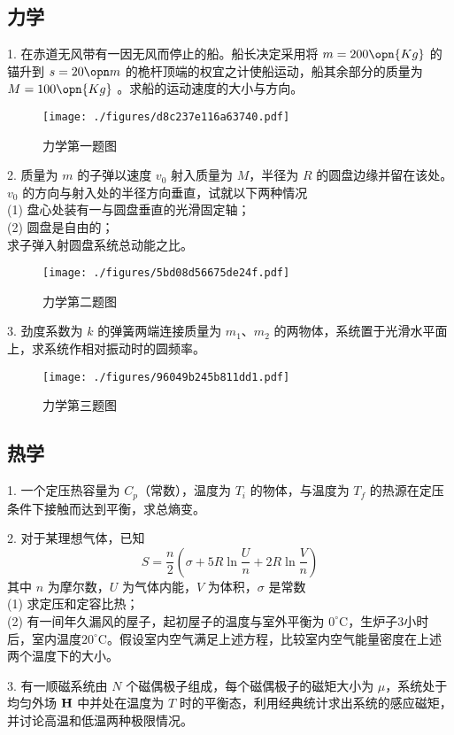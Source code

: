 \subsection{力学}
1. 在赤道无风带有一因无风而停止的船。船长决定采用将 $m=200\opn{Kg}$ 的锚升到 $s=20\opn m$ 的桅杆顶端的权宜之计使船运动，船其余部分的质量为 $M=100 \opn{Kg}$ 。求船的运动速度的大小与方向。
\begin{figure}[ht]
\centering
\texttt{[image: ./figures/d8c237e116a63740.pdf]}
\caption{力学第一题图} \label{fig_NJU12_1}
\end{figure}
2. 质量为 $m$ 的子弹以速度 $v_0$ 射入质量为 $M$，半径为 $R$ 的圆盘边缘并留在该处。$v_0$ 的方向与射入处的半径方向垂直，试就以下两种情况\\
(1) 盘心处装有一与圆盘垂直的光滑固定轴；\\
(2) 圆盘是自由的；\\
求子弹入射圆盘系统总动能之比。
\begin{figure}[ht]
\centering
\texttt{[image: ./figures/5bd08d56675de24f.pdf]}
\caption{力学第二题图} \label{fig_NJU12_2}
\end{figure}
3. 劲度系数为 $k$ 的弹簧两端连接质量为 $m_1$、$m_2$ 的两物体，系统置于光滑水平面上，求系统作相对振动时的圆频率。
\begin{figure}[ht]
\centering
\texttt{[image: ./figures/96049b245b811dd1.pdf]}
\caption{力学第三题图} \label{fig_NJU12_3}
\end{figure}
\subsection{热学}
1. 一个定压热容量为 $C_p$（常数），温度为 $T_i$ 的物体，与温度为 $T_f$ 的热源在定压条件下接触而达到平衡，求总熵变。

2. 对于某理想气体，已知
\begin{equation}
S=\frac n2 (\sigma+5R\ln{\frac Un}+2R\ln{\frac Vn})
\end{equation}
其中 $n$ 为摩尔数，$U$ 为气体内能，$V$ 为体积，$\sigma$ 是常数\\
(1) 求定压和定容比热；\\
(2) 有一间年久漏风的屋子，起初屋子的温度与室外平衡为 $0^\circ\mathrm{C}$，生炉子3小时后，室内温度$20^\circ\mathrm{C}$。假设室内空气满足上述方程，比较室内空气能量密度在上述两个温度下的大小。

3. 有一顺磁系统由 $N$ 个磁偶极子组成，每个磁偶极子的磁矩大小为 $\mu$，系统处于均匀外场 $\bf H$ 中并处在温度为 $T$ 时的平衡态，利用经典统计求出系统的感应磁矩，并讨论高温和低温两种极限情况。
